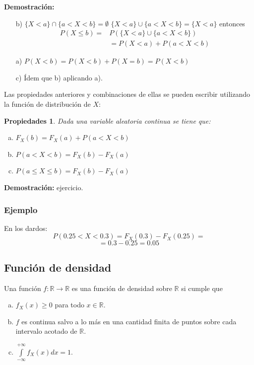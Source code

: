 \documentclass[handout]{beamer}\usepackage[]{graphicx}\usepackage[]{color}
\newcommand{\RR}{\mathbb{R}}
\renewcommand{\leq}{\leqslant}
\renewcommand{\geq}{\geqslant}
\theoremstyle{plain}
\newtheorem{prop}{Propiedades}
\theoremstyle{definition}
\begin{document}
\begin{frame}
\textbf{Demostración:}
\begin{itemize}
\item[b)] $\{X<a\}\cap \{a<X<b\}=\emptyset$
$\{X<a\}\cup \{a<X<b\}=\{X<a\}$ entonces
\begin{equation*}
\begin{split}
P(X\leq b)= & P(\{X<a\}\cup \{a<X<b\})\\
& = P(X<a)+P(a<X<b)
\end{split}
\end{equation*}

\item[a)] $P(X<b)=P(X<b)+P(X=b)=P(X<b)$
\item[c)] \'Idem que b) aplicando a).
\end{itemize}
\end{frame}

\begin{frame}
Las propiedades anteriores  y combinaciones de ellas se pueden
escribir utilizando la función de distribución de $X$:

\begin{prop}Dada una variable aleatoria continua se tiene que:
\begin{enumerate}[a)]
\item $F_{X}(b)=F_{X}(a)+P(a<X<b)$
\item $P(a<X<b)=F_{X}(b)-F_{X}(a)$
\item $P(a\leq X\leq b)=F_{X}(b)-F_{X}(a)$
\end{enumerate}
\end{prop}
\end{frame}

\begin{frame}
\textbf{Demostración:} ejercicio.

\frametitle{Ejemplo}
En los dardos:
$$P(0.25<X<0.3)=F_{X}(0.3)-F_{X}(0.25)=$$
$$=0.3-0.25=0.05$$

\end{frame}


\subsection{Función de densidad}
\begin{frame}
Una función $f:\RR\to\RR$ es una función de densidad sobre $\RR$ si cumple que

\begin{enumerate}[a)]
\item $f_{X}(x)\geq 0$ para todo $x \in\RR.$
\item $f$ es continua salvo a lo más en una cantidad finita de puntos sobre
cada intervalo acotado de $\RR$.
\item $\int\limits_{-\infty}^{+\infty} f_{X}(x) dx=1.$
\end{enumerate}
\end{frame}
\end{document}

